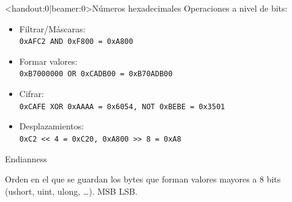 \begin{frame}<handout:0|beamer:0>{Números hexadecimales}
    Operaciones a nivel de bits:
    \small
    \begin{itemize}
        \item<3-> Filtrar/Máscaras:\\\texttt{0xAFC2 AND 0xF800 = 0xA800}
        \item<4-> Formar valores:\\\texttt{0xB7000000 OR 0xCADB00 = 0xB70ADB00}
        \item<5-> Cifrar:\\\texttt{0xCAFE XOR 0xAAAA = 0x6054, NOT 0xBEBE = 0x3501}
        \item<6-> Desplazamientos:\\\texttt{0xC2 << 4 = 0xC20, 0xA800 >> 8 = 0xA8}
    \end{itemize}
\end{frame}


\begin{frame}{Endianness}
    \begin{block}{}
        Orden en el que se guardan los bytes que forman valores mayores a 8 bits (ushort, uint, ulong, \ldots). MSB \textrightarrow LSB.
    \end{block}
    \centering{}
    \vfill
\end{frame}

